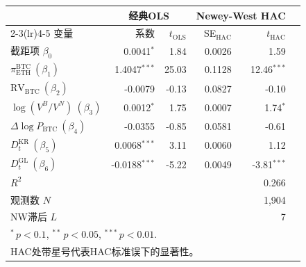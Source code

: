 \begin{tabular}{lrrrrr}
\toprule
& \multicolumn{2}{c}{经典OLS} & \multicolumn{2}{c}{Newey-West HAC} \\
\cmidrule(lr){2-3}\cmidrule(lr){4-5}
变量 & 系数 & $t_{\text{OLS}}$ & SE$_{\text{HAC}}$ & $t_{\text{HAC}}$ \\
\midrule
截距项 $\beta_0$ & 0.0041$^{*}$ & 1.84 & 0.0026 & 1.59 \\
$\pi^{\text{BTC}}_{\text{ETH}}\ (\beta_1)$ & 1.4047$^{***}$ & 25.03 & 0.1128 & 12.46$^{***}$ \\
$\text{RV}_{\text{BTC}}\ (\beta_2)$ & -0.0079 & -0.13 & 0.0827 & -0.10 \\
$\log(V^B/V^N)\ (\beta_3)$ & 0.0012$^{*}$ & 1.75 & 0.0007 & 1.74$^{*}$ \\
$\Delta\log P_{\text{BTC}}\ (\beta_4)$ & -0.0355 & -0.85 & 0.0581 & -0.61 \\
$D^{\text{KR}}_t\ (\beta_5)$ & 0.0068$^{***}$ & 3.11 & 0.0060 & 1.12 \\
$D^{\text{GL}}_t\ (\beta_6)$ & -0.0188$^{***}$ & -5.22 & 0.0049 & -3.81$^{***}$ \\
\midrule
$R^2$ & \multicolumn{4}{r}{0.266} \\
观测数 $N$ & \multicolumn{4}{r}{1,904} \\
NW滞后 $L$ & \multicolumn{4}{r}{7} \\
\bottomrule
\multicolumn{5}{l}{\footnotesize $^{*}\,p<0.1$, $^{**}\,p<0.05$, $^{***}\,p<0.01$.}\\
\multicolumn{5}{l}{\footnotesize HAC处带星号代表HAC标准误下的显著性。}\\
\end{tabular}